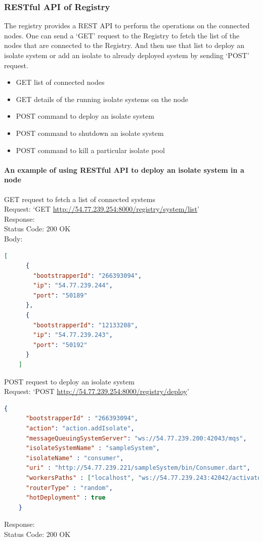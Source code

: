   \subsubsection{RESTful API of Registry}
  The registry provides a REST API to perform the operations on the connected nodes. One can send a ‘GET’ request to the Registry to fetch the list of the nodes that are connected to the Registry. And then use that list to deploy an isolate system or add an isolate to already deployed system by sending ‘POST’ request.
  \begin{itemize}
  \item GET list of connected nodes
  \item GET details of the running isolate systems on the node
  \item POST command to deploy an isolate system
  \item POST command to shutdown an isolate system
  \item POST command to kill a particular isolate pool
  \end{itemize}

\paragraph{An example of using RESTful API to deploy an isolate system in a node}

\begin{description}
  \item{GET request to fetch a list of connected systems}\\
  Request: ‘GET \url{http://54.77.239.254:8000/registry/system/list}’\\
  Response: \\
  Status Code: 200 OK\\
  Body:
  \begin{lstlisting}[language=json,firstnumber=1]
    [
      {
        "bootstrapperId": "266393094",
        "ip": "54.77.239.244",
        "port": "50189"
      },
      {
        "bootstrapperId": "12133208",
        "ip": "54.77.239.243",
        "port": "50192"
      }
    ]
  \end{lstlisting}

  \item{POST request to deploy an isolate system}\\
  Request: ‘POST \url{http://54.77.239.254:8000/registry/deploy}’
  \begin{lstlisting}[language=json,firstnumber=1]
    {
      "bootstrapperId" : "266393094",
      "action": "action.addIsolate",
      "messageQueuingSystemServer": "ws://54.77.239.200:42043/mqs",
      "isolateSystemName" : "sampleSystem",
      "isolateName" : "consumer",
      "uri" : "http://54.77.239.221/sampleSystem/bin/Consumer.dart",
      "workersPaths" : ["localhost", "ws://54.77.239.243:42042/activator"],
      "routerType" : "random",
      "hotDeployment" : true
    }
  \end{lstlisting}
  Response: \\
  Status Code: 200 OK\\
\end{description}

